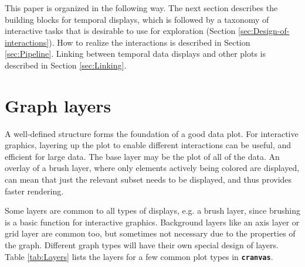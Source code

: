 \documentclass[12pt]{article}
\begin{document}

This paper is organized in the following way. The next section describes the building blocks for temporal displays, which is followed by a taxonomy of interactive tasks that is desirable to use for exploration (Section \ref{sec:Design-of-interactions}). How to realize the interactions is described in Section \ref{sec:Pipeline}. Linking between temporal data displays and other plots is described in Section \ref{sec:Linking}. 


\section{Graph layers\label{sec:graph-layers}}

A well-defined structure forms the foundation of a good data plot. For 
interactive graphics, layering up the plot to enable different interactions can be useful, and efficient for large data. The base layer may be the plot of all of the data. An overlay of a brush layer, where only elements actively being colored are displayed, can mean that just the relevant subset needs to be displayed, and thus provides faster rendering. 


Some layers are common to all types of displays, e.g. a brush
layer, since brushing is a basic function for interactive
graphics. Background layers like an axis layer or grid layer
are common too, but sometimes not necessary due to the properties
of the graph. Different graph types will have their own special
design of layers. Table \ref{tab:Layers} lists the layers for
a few common plot types in \texttt{\textbf{cranvas}}.
\end{document}

